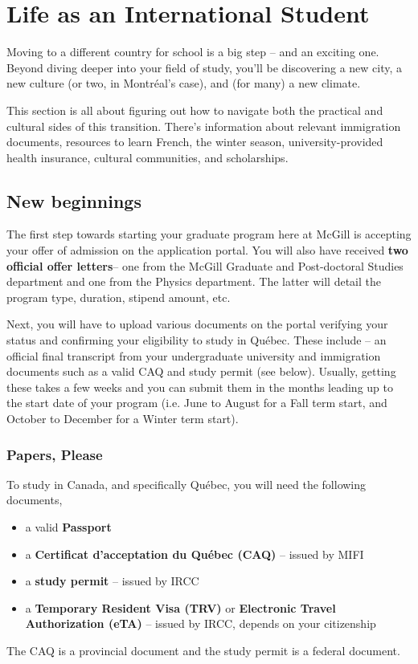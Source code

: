 
\chapter{Life as an International Student}
Moving to a different country for school is a big step -- and an exciting one. Beyond diving deeper into your field of study, you'll be discovering a new city, a new culture (or two, in Montr\'eal's case), and (for many) a new climate.

This section is all about figuring out how to navigate both the practical and cultural sides of this transition. There's information about relevant immigration documents, resources to learn French, the winter season, university-provided health insurance, cultural communities, and scholarships.

\section{New beginnings}
The first step towards starting your graduate program here at McGill is accepting your offer of admission on the application portal. You will also have received \textbf{two official offer letters}-- one from the McGill Graduate and Post-doctoral Studies department and one from the Physics department. The latter will detail the program type, duration, stipend amount, etc.

Next, you will have to upload various documents on the portal verifying your status and confirming your eligibility to study in Qu\'ebec. These include -- an official final transcript from your undergraduate university and immigration documents such as a valid CAQ and study permit (see below). Usually, getting these takes a few weeks and you can submit them in the months leading up to the start date of your program (i.e. June to August for a Fall term start, and October to December for a Winter term start).

\subsection{Papers, Please}
To study in Canada, and specifically Qu\'ebec, you will need the following documents,
\begin{plaindefinition}
\begin{itemize}
    \item a valid \textbf{Passport}
    \item a \textbf{Certificat d'acceptation du Québec (CAQ)} -- issued by MIFI
    \item a \textbf{study permit} -- issued by IRCC
    \item a \textbf{Temporary Resident Visa (TRV)} or \textbf{Electronic Travel Authorization (eTA)} -- issued by IRCC, depends on your citizenship
\end{itemize}
\end{plaindefinition}
The CAQ is a provincial document and the study permit is a federal document. 

